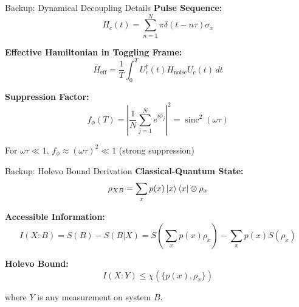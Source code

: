 \documentclass[aspectratio=169,12pt]{beamer}
\DeclareMathOperator{\sinc}{sinc}
\begin{document}
\appendix

\begin{frame}{Backup: Dynamical Decoupling Details}
\textbf{Pulse Sequence:}
$$H_c(t) = \sum_{n=1}^N \pi \delta(t - n\tau) \sigma_x$$

\vspace{0.3cm}

\textbf{Effective Hamiltonian in Toggling Frame:}
$$\bar{H}_{\text{eff}} = \frac{1}{T} \int_0^T U_c^\dagger(t) H_{\text{noise}} U_c(t) \, dt$$

\vspace{0.3cm}

\textbf{Suppression Factor:}
$$f_\phi(T) = \left| \frac{1}{N} \sum_{j=1}^N e^{i\phi_j} \right|^2 = \sinc^2(\omega \tau)$$

\vspace{0.3cm}

For $\omega \tau \ll 1$, $f_\phi \approx (\omega \tau)^2 \ll 1$ (strong suppression)
\end{frame}

\begin{frame}{Backup: Holevo Bound Derivation}
\textbf{Classical-Quantum State:}
$$\rho_{XB} = \sum_x p(x) \ket{x}\bra{x} \otimes \rho_x$$

\vspace{0.3cm}

\textbf{Accessible Information:}
$$I(X:B) = S(B) - S(B|X) = S\left(\sum_x p(x) \rho_x\right) - \sum_x p(x) S(\rho_x)$$

\vspace{0.3cm}

\textbf{Holevo Bound:}
$$I(X:Y) \leq \chi(\{p(x), \rho_x\})$$

where $Y$ is any measurement on system $B$.
\end{frame}
\end{document}
